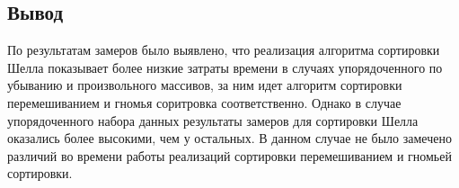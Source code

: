 \subsection*{Вывод}
По результатам замеров было выявлено, что реализация алгоритма сортировки Шелла
показывает более низкие затраты времени в случаях упорядоченного по убыванию и
произвольного массивов, за ним идет алгоритм сортировки перемешиванием и гномья
соритровка соответственно. Однако в случае упорядоченного набора данных
результаты замеров для сортировки Шелла оказались более высокими, чем у
остальных. В данном случае не было замечено различий во времени работы
реализаций сортировки перемешиванием и гномьей сортировки.

\pagebreak

